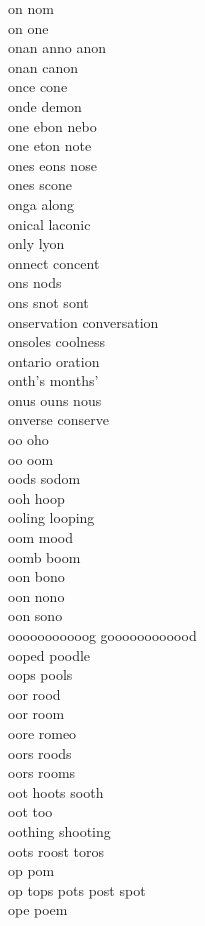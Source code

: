 on nom \\
on one \\
onan anno anon\\
onan canon \\
once cone\\
onde demon \\
one ebon nebo \\
one eton note \\
ones eons nose\\
ones scone \\
onga along \\
onical laconic \\
only lyon\\
onnect concent \\
ons nods \\
ons snot sont \\
onservation conversation \\
onsoles coolness \\
ontario oration\\
onth's months' \\
onus ouns nous\\
onverse conserve \\
oo oho \\
oo oom \\
oods sodom \\
ooh hoop \\
ooling looping \\
oom mood \\
oomb boom\\
oon bono \\
oon nono \\
oon sono \\
ooooooooooog goooooooooood \\
ooped poodle \\
oops pools \\
oor rood \\
oor room \\
oore romeo \\
oors roods \\
oors rooms \\
oot hoots sooth  \\
oot too\\
oothing shooting \\
oots roost toros \\
op pom \\
op tops pots post spot  \\
ope poem \\
